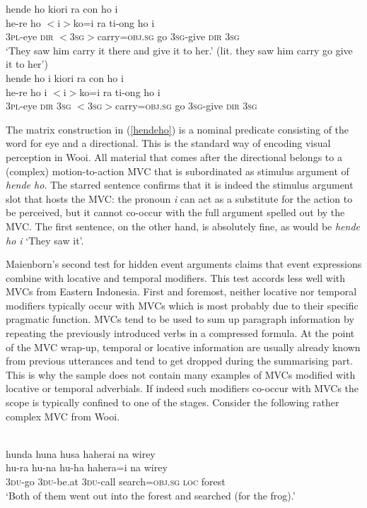 \ea \label{hendeho}
\ea
\glll hende ho kiori ra con ho i \\
he-re ho $<$i$>$ko=i ra ti-ong ho i \\
3\textsc{pl}-eye \textsc{dir} $<$3\textsc{sg}$>$carry=\textsc{obj}.\textsc{sg} go 3\textsc{sg}-give \textsc{dir} 3\textsc{sg}\\
\glft `They saw him carry it there and give it to her.' (lit. they saw him carry go give it to her')\\
\ex
\glll *hende ho i kiori ra con ho i\\
he-re ho i $<$i$>$ko=i ra ti-ong ho i \\
3\textsc{pl}-eye \textsc{dir} 3\textsc{sg} $<$3\textsc{sg}$>$carry=\textsc{obj}.\textsc{sg} go 3\textsc{sg}-give \textsc{dir} 3\textsc{sg}\\
\z
\z

The matrix construction in (\ref{hendeho}) is a nominal predicate consisting of the word for eye and a directional. This is the standard way of encoding visual perception in Wooi. All material that comes after the directional belongs to a (complex) motion-to-action MVC that is subordinated as stimulus argument of \textit{hende ho}. The starred sentence confirms that it is indeed the stimulus argument slot that hosts the MVC: the pronoun \textit{i} can act as a substitute for the action to be perceived, but it cannot co-occur with the full argument spelled out by the MVC. The first sentence, on the other hand, is absolutely fine, as would be \textit{hende ho i} `They saw it'.

Maienborn's second test for hidden event arguments claims that event expressions combine with locative and temporal modifiers. This test accords less well with MVCs from Eastern Indonesia. First and foremost, neither locative nor temporal modifiers typically occur with MVCs which is most probably due to their specific pragmatic function. MVCs tend to be used to sum up paragraph information by repeating the previously introduced verbs in a compressed formula. At the point of the MVC wrap-up, temporal or locative information are usually already known from previous utterances and tend to get dropped during the summarising part. This is why the sample does not contain many examples of MVCs modified with locative or temporal adverbials. If indeed such modifiers co-occur with MVCs the scope is typically confined to one of the stages. Consider the following rather complex MVC from Wooi.

\ea  
{}\\
\glll hunda huna husa haherai na wirey \\
hu-ra hu-na hu-ha hahera=i na wirey \\
3\textsc{du}-go 3\textsc{du}-be.at 3\textsc{du}-call search=\textsc{obj}.\textsc{sg} \textsc{loc} forest\\
\glft `Both of them went out into the forest and searched (for the frog).' \\
\z

